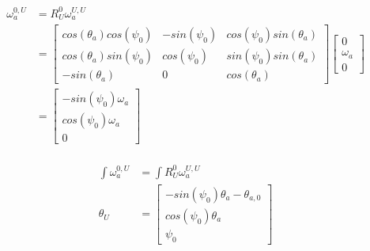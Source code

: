\begin{equation}
\begin{aligned}
\omega^{0,U}_a&=R^0_U \omega^{U,U}_a \\
 &=    \begin{bmatrix}
    cos(\theta_a) cos(\psi_0) & -sin(\psi_0) & cos(\psi_0) sin(\theta_a) \\
    cos(\theta_a) sin(\psi_0) & cos(\psi_0) & sin(\psi_0) sin(\theta_a)\\
    -sin(\theta_a) & 0 & cos(\theta_a) 
    \end{bmatrix}
    \begin{bmatrix}
    0 \\ \omega_a \\0
    \end{bmatrix}\\
&=\begin{bmatrix}
   -sin(\psi_0)\omega_a  \\ cos(\psi_0)\omega_a   \\0
    \end{bmatrix} \\
\end{aligned}
\end{equation}

\begin{equation}
\begin{aligned}
\int \omega^{0,U}_a&=\int R^0_U \omega^{U,U}_a \\
\theta_U &= 
\begin{bmatrix} 
-sin(\psi_0)\theta_a-\theta_{a,0} \\ cos(\psi_0)\theta_a \\ \psi_0
\end{bmatrix}
\end{aligned}
\end{equation}

